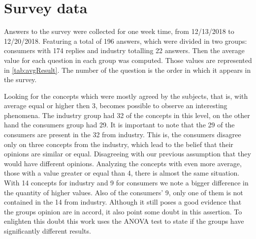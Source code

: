 \section{Survey data}

Answers to the survey were collected for one week time, from 12/13/2018 to 12/20/2018. Featuring a total of 196 answers, which were divided in two groups: consumers with 174 replies and industry totalling 22 answers. Then the average value for each question in each group was computed. Those values are represented in \autoref{tab:avgResult}. The number of the question is the order in which it appears in the survey.



Looking for the concepts which were mostly agreed by the subjects, that is, with average equal or higher then 3, becomes possible to observe an interesting phenomena. The industry group had 32 of the concepts in this level, on the other hand the consumers group had 29. It is important to note that the 29 of the consumers are present in the 32 from industry. This is, the consumers disagree only on three concepts from the industry, which lead to the belief that their opinions are similar or equal. Disagreeing with our previous assumption that they would have different opinions. Analyzing the concepts with even more average, those with a value greater or equal than 4, there is almost the same situation. With 14 concepts for industry and 9 for consumers we note a bigger difference in the quantity of higher values. Also of the consumers' 9, only one of them is not contained in the 14 from industry. Although it still poses a good evidence that the groups opinion are in accord, it also point some doubt in this assertion. To enlighten this doubt this work uses the ANOVA test to state if the groups have significantly different results.

